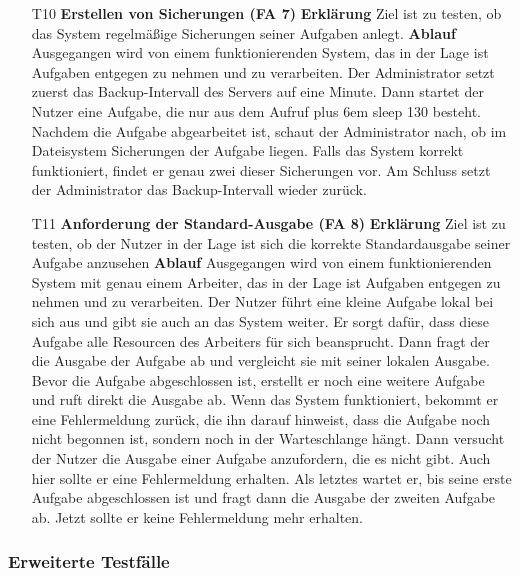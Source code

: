 \documentclass[a4paper,12pt]{article}
\makeatletter
\newenvironment{mycode}
 {\def\@xobeysp{\ }\verbatim\rightskip=0pt plus 6em\relax}
 {\endverbatim}
\makeatother
\begin{document}
\begin{itemize}
\item[T10] \textbf{Erstellen von Sicherungen (FA 7)}
\subitem \textbf{Erklärung} Ziel ist zu testen, ob das System regelmäßige Sicherungen seiner Aufgaben anlegt.
\subitem \textbf{Ablauf} Ausgegangen wird von einem funktionierenden System, das in der Lage ist Aufgaben entgegen zu nehmen und zu verarbeiten.
Der Administrator setzt zuerst das Backup-Intervall des Servers auf eine Minute.
Dann startet der Nutzer eine Aufgabe, die nur aus dem Aufruf
\begin{mycode}
sleep 130
\end{mycode}
besteht. Nachdem die Aufgabe abgearbeitet ist, schaut der Administrator nach, ob im Dateisystem Sicherungen der Aufgabe liegen.
Falls das System korrekt funktioniert, findet er genau zwei dieser Sicherungen vor.
Am Schluss setzt der Administrator das Backup-Intervall wieder zurück.

\item[T11] \textbf{Anforderung der Standard-Ausgabe (FA 8)}
\subitem \textbf{Erklärung} Ziel ist zu testen, ob der Nutzer in der Lage ist sich die korrekte Standardausgabe seiner Aufgabe anzusehen
\subitem \textbf{Ablauf} Ausgegangen wird von einem funktionierenden System mit genau einem Arbeiter, das in der Lage ist Aufgaben entgegen zu nehmen und zu verarbeiten.
Der Nutzer führt eine kleine Aufgabe lokal bei sich aus und gibt sie auch an das System weiter. Er sorgt dafür, dass diese Aufgabe alle Resourcen des Arbeiters für sich beansprucht.
Dann fragt der die Ausgabe der Aufgabe ab und vergleicht sie mit seiner lokalen Ausgabe.
Bevor die Aufgabe abgeschlossen ist, erstellt er noch eine weitere Aufgabe und ruft direkt die Ausgabe ab.
Wenn das System funktioniert, bekommt er eine Fehlermeldung zurück, die ihn darauf hinweist, dass die Aufgabe noch nicht begonnen ist, sondern noch in der Warteschlange hängt.
Dann versucht der Nutzer die Ausgabe einer Aufgabe anzufordern, die es nicht gibt. Auch hier sollte er eine Fehlermeldung erhalten.
Als letztes wartet er, bis seine erste Aufgabe abgeschlossen ist und fragt dann die Ausgabe der zweiten Aufgabe ab. Jetzt sollte er keine Fehlermeldung mehr erhalten.

\end{itemize}

\subsubsection{Erweiterte Testfälle}
\end{document}

